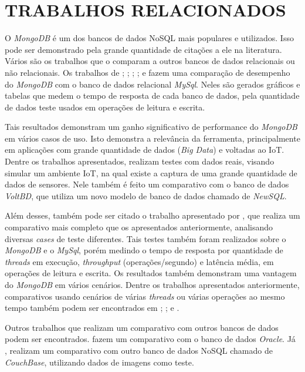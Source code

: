 \chapter{TRABALHOS RELACIONADOS}
\label{TrabalhosRelacionados}

O \textit{MongoDB} é um dos bancos de dados NoSQL mais populares e utilizados. Isso pode ser demonstrado pela grande quantidade de citações a ele na literatura. Vários são os trabalhos que o comparam a outros bancos de dados relacionais ou não relacionais. Os trabalhos de ; ; ; ; e  fazem uma comparação de desempenho do \textit{MongoDB} com o banco de dados relacional \textit{MySql}. Neles são gerados gráficos e tabelas que medem o tempo de resposta de cada banco de dados, pela quantidade de dados teste usados em operações de leitura e escrita.

Tais resultados demonstram um ganho significativo de performance do \textit{MongoDB} em vários casos de uso. Isto demonstra a relevância da ferramenta, principalmente em aplicações com grande quantidade de dados (\textit{Big Data}) e voltadas ao IoT. Dentre os trabalhos apresentados,  realizam testes com dados reais, visando simular um ambiente IoT, na qual existe a captura de uma grande quantidade de dados de sensores. Nele também é feito um comparativo com o banco de dados \textit{VoltBD}, que utiliza um novo modelo de banco de dados chamado de \textit{NewSQL}.

Além desses, também pode ser citado o trabalho apresentado por , que realiza um comparativo mais completo que os apresentados anteriormente, analisando diversas \textit{cases} de teste diferentes. Tais testes também foram realizados sobre o \textit{MongoDB} e o \textit{MySql}, porém medindo o tempo de resposta por quantidade de \textit{threads} em execução, \textit{throughput} (operações/segundo) e latência média, em operações de leitura e escrita. Os resultados também demonstram uma vantagem do \textit{MongoDB} em vários cenários. Dentre os trabalhos apresentados anteriormente, comparativos usando cenários de várias \textit{threads} ou várias operações ao mesmo tempo também podem ser encontrados em ; ; e .

Outros trabalhos que realizam um comparativo com outros bancos de dados podem ser encontrados.  fazem um comparativo com o banco de dados \textit{Oracle}. Já , realizam um comparativo com outro banco de dados NoSQL chamado de \textit{CouchBase}, utilizando dados de imagens como teste.

